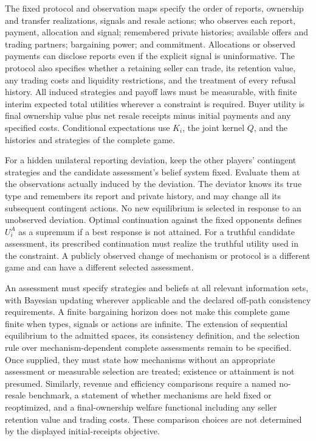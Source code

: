 \documentclass[11pt,a4paper]{article}
\begin{document}
The fixed protocol and observation maps specify the order of reports, ownership and transfer realizations, signals and resale actions; who observes each report, payment, allocation and signal; remembered private histories; available offers and trading partners; bargaining power; and commitment. Allocations or observed payments can disclose reports even if the explicit signal is uninformative. The protocol also specifies whether a retaining seller can trade, its retention value, any trading costs and liquidity restrictions, and the treatment of every refusal history. All induced strategies and payoff laws must be measurable, with finite interim expected total utilities wherever a constraint is required. Buyer utility is final ownership value plus net resale receipts minus initial payments and any specified costs. Conditional expectations use \(K_i\), the joint kernel \(Q\), and the histories and strategies of the complete game.

For a hidden unilateral reporting deviation, keep the other players' contingent strategies and the candidate assessment's belief system fixed. Evaluate them at the observations actually induced by the deviation. The deviator knows its true type and remembers its report and private history, and may change all its subsequent contingent actions. No new equilibrium is selected in response to an unobserved deviation. Optimal continuation against the fixed opponents defines \(U_i^A\) as a supremum if a best response is not attained. For a truthful candidate assessment, its prescribed continuation must realize the truthful utility used in the constraint. A publicly observed change of mechanism or protocol is a different game and can have a different selected assessment.

An assessment must specify strategies and beliefs at all relevant information sets, with Bayesian updating wherever applicable and the declared off-path consistency requirements. A finite bargaining horizon does not make this complete game finite when types, signals or actions are infinite. The extension of sequential equilibrium to the admitted spaces, its consistency definition, and the selection rule over mechanism-dependent complete assessments remain to be specified. Once supplied, they must state how mechanisms without an appropriate assessment or measurable selection are treated; existence or attainment is not presumed. Similarly, revenue and efficiency comparisons require a named no-resale benchmark, a statement of whether mechanisms are held fixed or reoptimized, and a final-ownership welfare functional including any seller retention value and trading costs. These comparison choices are not determined by the displayed initial-receipts objective.
\end{document}
